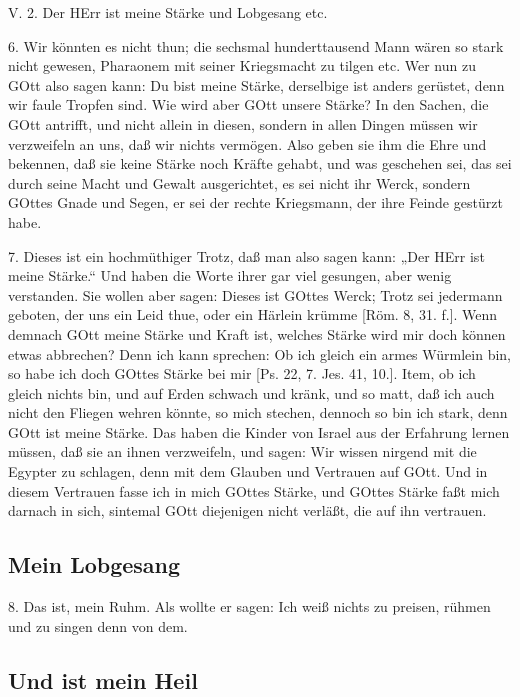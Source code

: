 \begin{schriftzitat}
V. 2. Der HErr ist meine Stärke und Lobgesang etc.
\end{schriftzitat}

6. Wir könnten es nicht thun; die sechsmal hunderttausend Mann wären so stark nicht gewesen, Pharaonem mit seiner Kriegsmacht zu tilgen etc. Wer nun zu GOtt also sagen kann: Du bist meine Stärke, derselbige ist anders gerüstet, denn wir faule Tropfen sind. Wie wird aber GOtt unsere Stärke? In den Sachen, die GOtt antrifft, und nicht allein in diesen, sondern in allen Dingen müssen wir verzweifeln an uns, daß wir nichts vermögen. Also geben sie ihm die Ehre und bekennen, daß sie keine Stärke noch Kräfte gehabt, und was geschehen sei, das sei durch seine Macht und Gewalt ausgerichtet, es sei nicht ihr Werck, sondern GOttes Gnade und Segen, er sei der rechte Kriegsmann, der ihre Feinde gestürzt habe.

7. Dieses ist ein hochmüthiger Trotz, daß man also sagen kann: „Der HErr ist meine Stärke.“ Und haben die Worte ihrer gar viel gesungen, aber wenig verstanden. Sie wollen aber sagen: Dieses ist GOttes Werck; Trotz sei jedermann geboten, der uns ein Leid thue, oder ein Härlein krümme [Röm. 8, 31. f.]. Wenn demnach GOtt meine Stärke und Kraft ist, welches Stärke wird mir doch können etwas abbrechen? Denn ich kann sprechen: Ob ich gleich ein armes Würmlein bin, so habe ich doch GOttes Stärke bei mir [Ps. 22, 7. Jes. 41, 10.]. Item, ob ich gleich nichts bin, und auf Erden schwach und kränk, und so matt, daß ich auch nicht den Fliegen wehren könnte, so mich stechen, dennoch so bin ich stark, denn GOtt ist meine Stärke. Das haben die Kinder von Israel aus der Erfahrung lernen müssen, daß sie an ihnen verzweifeln, und sagen: Wir wissen nirgend mit die Egypter zu schlagen, denn mit dem Glauben und Vertrauen auf GOtt. Und in diesem Vertrauen fasse ich in mich GOttes Stärke, und GOttes Stärke faßt mich darnach in sich, sintemal GOtt diejenigen nicht verläßt, die auf ihn vertrauen.

\subsection{Mein Lobgesang}

8. Das ist, mein Ruhm. Als wollte er sagen: Ich weiß nichts zu preisen, rühmen und zu singen denn von dem.

\subsection{Und ist mein Heil}

